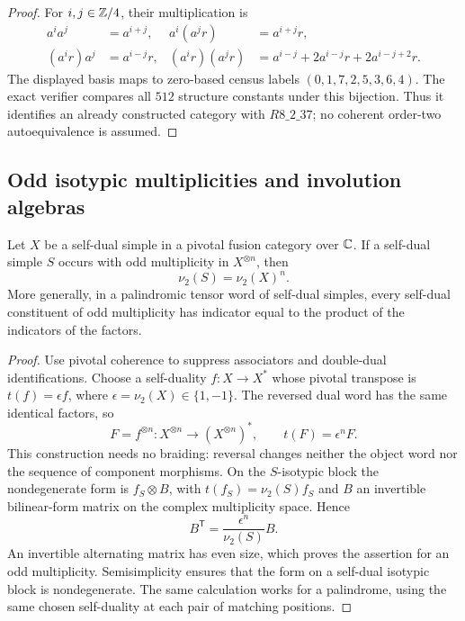 \begin{proof}
For $i,j\in\mathbb Z/4$, their multiplication is
\[
\begin{aligned}
a^ia^j&=a^{i+j},&
a^i(a^jr)&=a^{i+j}r,\\
(a^ir)a^j&=a^{i-j}r,&
(a^ir)(a^jr)&=a^{i-j}+2a^{i-j}r+2a^{i-j+2}r.
\end{aligned}
\]
The displayed basis maps to zero-based census labels
$(0,1,7,2,5,3,6,4)$. The exact verifier compares all $512$ structure
constants under this bijection. Thus it identifies an already
constructed category with $R8\_2\_37$; no coherent order-two
autoequivalence is assumed.
\end{proof}

\subsection{Odd isotypic multiplicities and involution algebras}

\begin{lemma}\label{lem:palindromic-fs}
Let $X$ be a self-dual simple in a pivotal fusion category over
$\mathbb C$. If a self-dual simple $S$ occurs with odd multiplicity in
$X^{\otimes n}$, then
\[
\nu_2(S)=\nu_2(X)^n.
\]
More generally, in a palindromic tensor word of self-dual simples,
every self-dual constituent of odd multiplicity has indicator equal
to the product of the indicators of the factors.
\end{lemma}
\begin{proof}
Use pivotal coherence to suppress associators and double-dual
identifications. Choose a self-duality $f:X\to X^*$ whose pivotal
transpose is $t(f)=\epsilon f$, where $\epsilon=\nu_2(X)\in\{1,-1\}$.
The reversed dual word has the same identical factors, so
\[
F=f^{\otimes n}:X^{\otimes n}\longrightarrow(X^{\otimes n})^*,
\qquad t(F)=\epsilon^nF.
\]
This construction needs no braiding: reversal changes neither the
object word nor the sequence of component morphisms. On the
$S$-isotypic block the nondegenerate form is $f_S\otimes B$, with
$t(f_S)=\nu_2(S)f_S$ and $B$ an invertible bilinear-form matrix on
the complex multiplicity space. Hence
\[
B^{\mathsf T}=\frac{\epsilon^n}{\nu_2(S)}B.
\]
An invertible alternating matrix has even size, which proves the
assertion for an odd multiplicity. Semisimplicity ensures that the
form on a self-dual isotypic block is nondegenerate. The same
calculation works for a palindrome, using the same chosen
self-duality at each pair of matching positions.
\end{proof}

